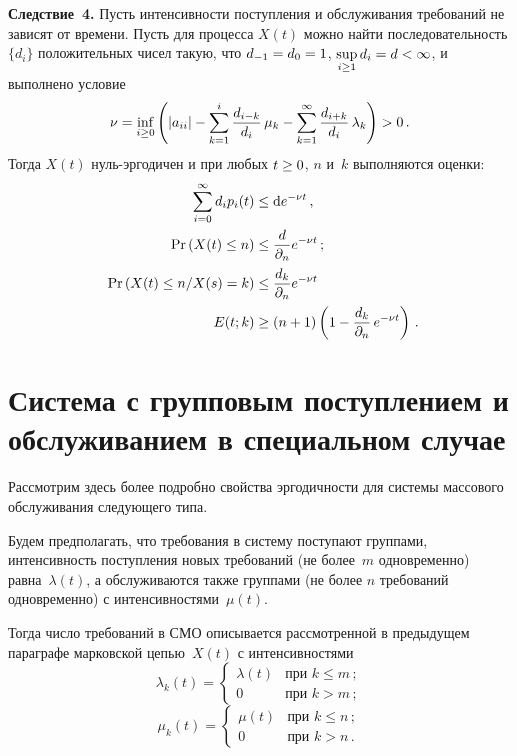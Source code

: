 \begin{multicols}{2}
\noindent
\textbf{Следствие~4.}
Пусть интенсивности поступления и обслуживания требований не зависят от времени. 
Пусть для процесса $X\left( t\right) $ можно найти последовательность $\{d_i\}$
положительных чисел такую, что  $d_{-1}\hm=d_{0}\hm=1$, $\sup\limits_{i \ge
1} d_i \hm= {d}\hm<\infty$, и выполнено условие
\begin{equation*}
\nu = \inf\limits_{i \ge 0} \left( |a_{ii}| -\sum\limits_{k=1}^{i}\displaystyle\frac{\displaystyle d_{i-k}\mathstrut}{\displaystyle d_i\mathstrut}\,\mu_k 
- \sum\limits_{k=1}^{\infty} \displaystyle\frac{\displaystyle d_{i+k}\mathstrut}{\displaystyle d_i\mathstrut}\,\lambda_{k}
 \right) > 0\,.
\end{equation*}
Тогда  $X\left( t\right) $ нуль-эр\-го\-ди\-чен и при любых $t \hm\ge 0$, $n$ и~$k$
выполняются оценки:
\begin{align*}
\sum\limits_{i=0}^{\infty} d_i p_i (t) &\le
 {\rm d} e^{-\nu t}\, ,  
\\
\mathrm{Pr} \left(X(t)  \le n \right) &\le \displaystyle\frac{\displaystyle {d}\mathstrut}{\displaystyle {\partial}_n\mathstrut}e^{-\nu t}\,; 
\\
\enskip \mathrm{Pr} \left(X(t)  \le n / X(s) = k \right) &\le \displaystyle\frac{\displaystyle {d_k}\mathstrut}{\displaystyle {\partial}_n\mathstrut}e^{-\nu t}
\\
E(t;k) &\ge \left(n+1\right) \left(1 - \displaystyle\frac{\displaystyle d_k\mathstrut}{\displaystyle {\partial}_n\mathstrut}\,
e^{-\nu t}\right)\,.  
\end{align*}


\section{Система с групповым поступлением и обслуживанием в специальном случае}

Рассмотрим здесь более подробно свойства эргодичности для сис\-те\-мы массового 
обслуживания следующего типа.

Будем предполагать, что требования в систему поступают группами, интенсивность 
поступления новых требований (не более~$m$ одновременно) равна~$\lambda(t)$, а 
обслуживаются также группами (не более $n$ требований одновременно) с интенсивностями~$\mu (t)$.

Тогда число требований в СМО описывается рассмотренной в предыдущем параграфе марковской 
цепью~$X(t)$ с интенсивностями
\begin{equation*}
\lambda_{k}(t)= \begin{cases}
\lambda\left( t\right)   & \mbox {при } k \le m\,;  \\
0 & \mbox {при } k > m\,;
\end{cases}
\label{3001}
\end{equation*}
\begin{equation*}
\mu_{k}(t)=  \begin{cases}
\mu\left( t\right)   & \mbox {при } k \le n\,;  \\
0 & \mbox {при } k > n\,.
\end{cases}
\end{equation*}


\end{multicols}
